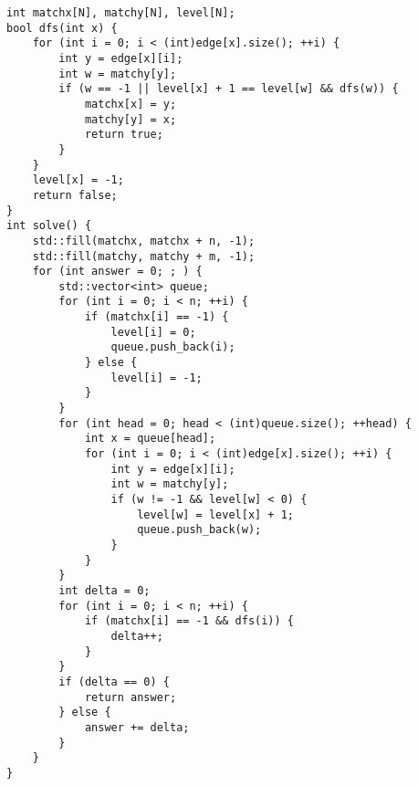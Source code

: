 \begin{lstlisting}
int matchx[N], matchy[N], level[N];
bool dfs(int x) {
    for (int i = 0; i < (int)edge[x].size(); ++i) {
        int y = edge[x][i];
        int w = matchy[y];
        if (w == -1 || level[x] + 1 == level[w] && dfs(w)) {
            matchx[x] = y;
            matchy[y] = x;
            return true;
        }
    }
    level[x] = -1;
    return false;
}
int solve() {
    std::fill(matchx, matchx + n, -1);
    std::fill(matchy, matchy + m, -1);
    for (int answer = 0; ; ) {
        std::vector<int> queue;
        for (int i = 0; i < n; ++i) {
            if (matchx[i] == -1) {
                level[i] = 0;
                queue.push_back(i);
            } else {
                level[i] = -1;
            }
        }
        for (int head = 0; head < (int)queue.size(); ++head) {
            int x = queue[head];
            for (int i = 0; i < (int)edge[x].size(); ++i) {
                int y = edge[x][i];
                int w = matchy[y];
                if (w != -1 && level[w] < 0) {
                    level[w] = level[x] + 1;
                    queue.push_back(w);
                }
            }
        }
        int delta = 0;
        for (int i = 0; i < n; ++i) {
            if (matchx[i] == -1 && dfs(i)) {
                delta++;
            }
        }
        if (delta == 0) {
            return answer;
        } else {
            answer += delta;
        }
    }
}
\end{lstlisting}
